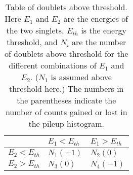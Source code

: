 \begin{table}
\centering
\setlength\tabcolsep{10pt}
\renewcommand{\arraystretch}{1.2}
\begin{tabular*}{.8\linewidth}{@{\extracolsep{\fill}}lll}
  \hline
  	        & $E_{1} < E_{th}$ & $E_{1} > E_{th}$ \\
  \hline
  	$E_{2} < E_{th}$ & $N_{1} (+1)$ & $N_{2} (0)$ \\
  	$E_{2} > E_{th}$ & $N_{3} (0)$ & $N_{4} (-1)$
\end{tabular*}
\caption[Number of doublet counts added to pileup histogram from shadow method]{Table of doublets above threshold. Here $E_{1}$ and $E_{2}$ are the energies of the two singlets, $E_{th}$ is the energy threshold, and $N_{i}$ are the number of doublets above threshold for the different combinations of $E_{1}$ and $E_{2}$. ($N_{1}$ is assumed above threshold here.) The numbers in the parentheses indicate the number of counts gained or lost in the pileup histogram.}
\label{Tab:PileupDoublets}
\end{table}


